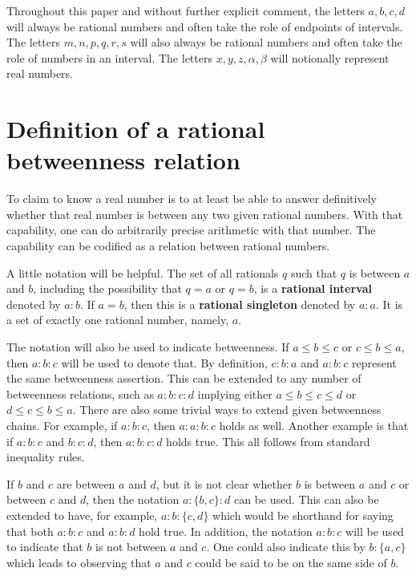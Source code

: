 \documentclass{rmj-public}
\begin{document}
Throughout this paper and without further explicit comment, the letters $a, b, c, d$ will always be rational numbers and often take the role of endpoints of intervals. The letters $m, n, p, q, r, s$ will also always be rational numbers and often take the role of numbers in an interval. The letters $x, y, z, \alpha, \beta$ will notionally represent real numbers.

\section{Definition of a rational betweenness relation}

To claim to know a real number is to at least be able to answer definitively whether that real number is between any two given rational numbers. With that capability, one can do arbitrarily precise arithmetic with that number. The capability can be codified as a relation between rational numbers. 

A little notation will be helpful. The set of all rationals $q$ such that $q$ is between $a$ and $b$, including the possibility that $q=a$ or $q=b$, is a \textbf{rational interval} denoted by $a:b$. If $a=b$, then this is a \textbf{rational singleton} denoted by $a:a$. It is a set of exactly one rational number, namely, $a$. 

The notation will also be used to indicate betweenness. If $a \leq b \leq c$ or $c \leq b \leq a$, then $a:b:c$ will be used to denote that. By definition, $c:b:a$ and $a:b:c$ represent the same betweenness assertion. This can be extended to any number of betweenness relations, such as $a:b:c:d$ implying either $a \leq b \leq c \leq d$ or $d \leq c \leq b \leq a$. There are also some trivial ways to extend given betweenness chains. For example, if $a:b:c$, then $a:a:b:c$ holds as well. Another example is that if $a:b:c$ and $b:c:d$, then $a:b:c:d$ holds true. This all follows from standard inequality rules. 

If $b$ and $c$ are between $a$ and $d$, but it is not clear whether $b$ is between $a$ and $c$ or between $c$ and $d$, then the notation $a:\{b,c\}:d$ can be used. This can also be extended to have, for example, $a:b:\{c,d\}$ which would be shorthand for saying that both $a:b:c$ and $a:b:d$ hold true. In addition, the notation \sout{$a:b:c$} will be used to indicate that $b$ is not between $a$ and $c$. One could also indicate this by $b:\{a,c\}$ which leads to observing that $a$ and $c$ could be said to be on the same side of $b$. 
\end{document}
